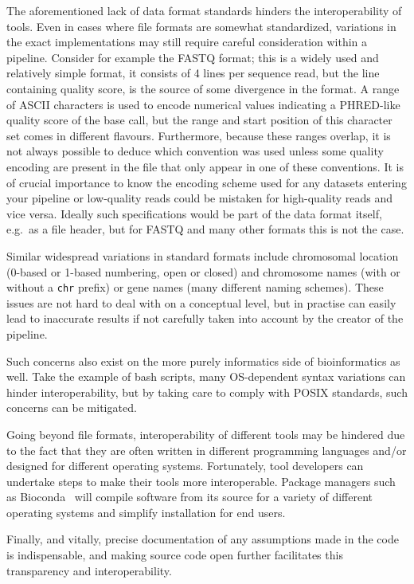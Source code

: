 \begin{justify}
The aforementioned lack of data format standards hinders the interoperability of tools. Even in cases where file formats are somewhat standardized, variations in the exact implementations may still require careful consideration within a pipeline. Consider for example the FASTQ format; this is a widely used and relatively simple format, it consists of 4 lines per sequence read, but the line containing quality score, is the source of some divergence in the format. A range of ASCII characters is used to encode numerical values indicating a PHRED-like quality score of the base call, but the range and start position of this character set comes in different flavours. Furthermore, because these ranges overlap, it is not always possible to deduce which convention was used unless some quality encoding are present in the file that only appear in one of these conventions. It is of crucial importance to know the encoding scheme used for any datasets entering your pipeline or low-quality reads could be mistaken for high-quality reads and vice versa. Ideally such specifications would be part of the data format itself, e.g.\ as a file header, but for FASTQ and many other formats this is not the case.

Similar widespread variations in standard formats include chromosomal location (0-based or 1-based numbering, open or closed) and chromosome names (with or without a \verb+chr+ prefix) or gene names (many different naming schemes). These issues are not hard to deal with on a conceptual level, but in practise can easily lead to inaccurate results if not carefully taken into account by the creator of the pipeline.

Such concerns also exist on the more purely informatics side of bioinformatics as well. Take the example of bash scripts, many OS-dependent syntax variations can hinder interoperability, but by taking care to comply with POSIX standards, such concerns can be mitigated.

Going beyond file formats, interoperability of different tools may be hindered due to the fact that they are often written in different programming languages and/or designed for different operating systems. Fortunately, tool developers can undertake steps to make their tools more interoperable. Package managers such as Bioconda~\cite{gruning2017bioconda} will compile software from its source for a variety of different operating systems and simplify installation for end users.

Finally, and vitally, precise documentation of any assumptions made in the code is indispensable, and making source code open further facilitates this transparency and interoperability.



\end{justify}

